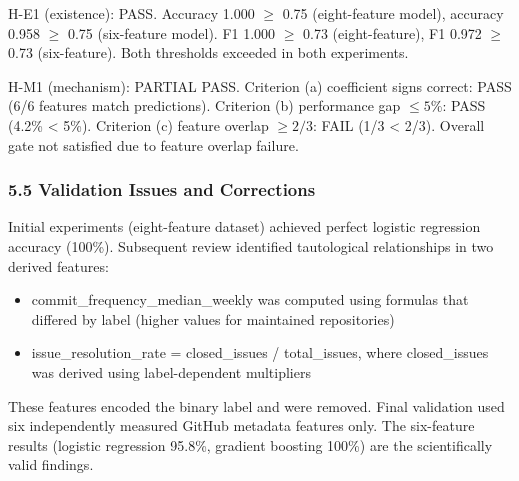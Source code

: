 H-E1 (existence): PASS. Accuracy 1.000 $\geq$ 0.75 (eight-feature model), accuracy 0.958 $\geq$ 0.75 (six-feature model). F1 1.000 $\geq$ 0.73 (eight-feature), F1 0.972 $\geq$ 0.73 (six-feature). Both thresholds exceeded in both experiments.

H-M1 (mechanism): PARTIAL PASS. Criterion (a) coefficient signs correct: PASS (6/6 features match predictions). Criterion (b) performance gap $\leq 5$\%: PASS (4.2\% < 5\%). Criterion (c) feature overlap $\geq 2/3$: FAIL (1/3 < 2/3). Overall gate not satisfied due to feature overlap failure.

\subsubsection{5.5 Validation Issues and Corrections}

Initial experiments (eight-feature dataset) achieved perfect logistic regression accuracy (100\%). Subsequent review identified tautological relationships in two derived features:
\begin{itemize}
\item commit\_frequency\_median\_weekly was computed using formulas that differed by label (higher values for maintained repositories)
\item issue\_resolution\_rate = closed\_issues / total\_issues, where closed\_issues was derived using label-dependent multipliers
\end{itemize}

These features encoded the binary label and were removed. Final validation used six independently measured GitHub metadata features only. The six-feature results (logistic regression 95.8\%, gradient boosting 100\%) are the scientifically valid findings.
